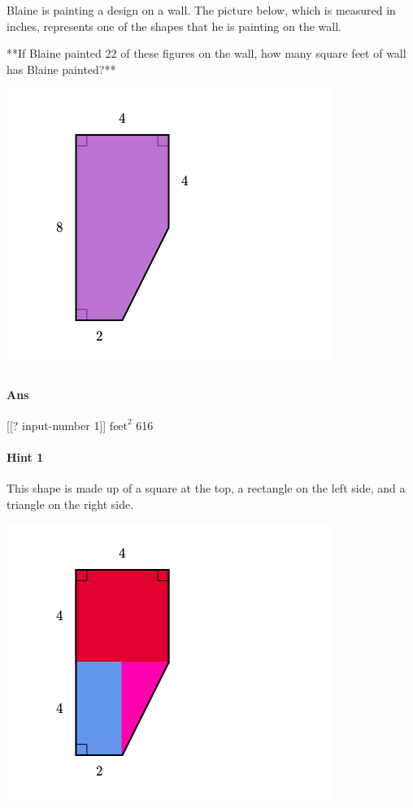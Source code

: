 \documentclass[twocolumn,10pt]{article}
\def\shrinkfactor{0.55}
\begin{document}
\noindent
Blaine is painting a design on a wall.  The picture below, which is measured in inches, represents one of the shapes that he is painting on the wall.  

**If Blaine painted 22 of these figures on the wall, how many square feet of wall has Blaine painted?**  


\includegraphics[scale=\shrinkfactor]{figures/ed8d325b95059dd0c8803395e12520bc9ff14cd4.png}

\paragraph{Ans}  [[? input-number 1]] $\text{feet}^2$  616

\paragraph{Hint 1}This shape is made up of a square at the top, a rectangle on the left side, and a triangle on the right side.    


\includegraphics[scale=\shrinkfactor]{figures/b38c10de64f86ab72f10f002bed91ecdbb4d02ab.png}  
 
\end{document}
